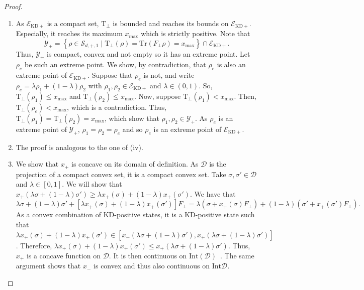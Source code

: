 \documentclass[a4paper, notitlepage, 11pt]{article}
\numberwithin{equation}{section}
\newcommand{\mcl}[1]{\mathcal{#1}}
\newcommand{\EcalKDC}{{\mathcal E}_{\mathrm{KD+}}}
\newcommand{\SAOpone}{\mathcal{S}_{d,+,1}}
\begin{document}
\begin{proof}
\begin{enumerate}[label=(\roman*),wide, labelindent=0pt]
\item As $\EcalKDC$ is a compact set, $\mathrm{T}_{\perp}$ is bounded and reaches its bounds on $\EcalKDC$. Especially, it reaches its maximum $x_{\max}$ which is strictly positive. Note that  
\begin{equation}\label{eq:Ydef}
\mcl{Y}_{+} = \left\{\rho\in \SAOpone \mid \mathrm{T}_{\perp}(\rho)=\mathrm{Tr}(F_{\perp}\rho) = x_{\max}\right\}\cap \EcalKDC.
\end{equation}
Thus, $\mcl{Y}_{+}$ is compact, convex and not empty so it has an extreme point. Let $\rho_e$ be such an extreme point. We show, by contradiction, that $\rho_e$ is also an extreme point of $\EcalKDC$. Suppose that $\rho_e$ is not, and write $\rho_e = \lambda\rho_1 +(1-\lambda)\rho_2$ with $\rho_1,\rho_2\in\EcalKDC$ and $\lambda\in(0,1)$. So, $\mathrm{T}_{\perp}(\rho_1) \leqslant x_{\max}$ and $\mathrm{T}_{\perp}(\rho_2) \leqslant x_{\max}$. Now, suppose $\mathrm{T}_{\perp}(\rho_1) < x_{\max}$. Then, $
\mathrm{T}_{\perp}(\rho_e) < x_{\max} $,
which is a contradiction. Thus,  $\mathrm{T}_{\perp}(\rho_1)=\mathrm{T}_{\perp}(\rho_2)=x_{\max}$, which show that $\rho_1,\rho_2\in\mcl{Y}_{+}.$ As $\rho_e$ is an extreme point of $\mcl{Y}_{+}$, $\rho_1=\rho_2=\rho_e$ and so $\rho_e$ is an extreme point of $\EcalKDC$.

\item The proof is analogous to the one of (iv).

\item We show that $x_{+}$ is concave on its domain of definition. As $\mcl{D}$ is the projection of a compact convex set, it is a compact convex set. Take $\sigma,\sigma'\in \mcl{D}$ and $\lambda\in[0,1]$. We will show that $x_{+}(\lambda\sigma + (1-\lambda)\sigma') \geqslant \lambda x_{+}(\sigma) + (1-\lambda)x_{+}(\sigma') $. We have that
\[
\lambda \sigma + (1-\lambda) \sigma' + \left[\lambda x_{+}(\sigma) + (1-\lambda)x_{+}(\sigma')\right]F_{\perp} = \lambda ( \sigma + x_{+}(\sigma)F_{\perp}) +  (1-\lambda) ( \sigma' + x_{+}(\sigma')F_{\perp}).
\]
As a convex combination of KD-positive states, it is a KD-positive state such that $\lambda x_{+}(\sigma) + (1-\lambda)x_{+}(\sigma')\in[x_{-}(\lambda \sigma + (1-\lambda) \sigma'),x_{+}(\lambda \sigma + (1-\lambda) \sigma')]$. Therefore, $\lambda x_{+}(\sigma) + (1-\lambda)x_{+}(\sigma')\leqslant x_{+}(\lambda\sigma + (1-\lambda)\sigma')$. Thus, $x_{+}$ is a concave function on $\mcl{D}$. It is then continuous on $\mathrm{Int}(\mcl{D})$~\cite{hiriart-urrutylemarechal2001}. The same argument shows that $x_{-}$ is convex and thus also continuous on $\mathrm{Int}{\mcl{D}}$.

\end{enumerate}
\end{proof}
\end{document}
